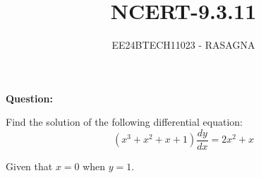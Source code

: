 \documentclass[journal]{IEEEtran}
\begin{document}

\vspace{3cm}

\title{NCERT-9.3.11}
\author{EE24BTECH11023 - RASAGNA}

{\let\newpage\relax\maketitle}

\renewcommand{\thefigure}{\theenumi}
\renewcommand{\thetable}{\theenumi}
\setlength{\intextsep}{10pt} %


\renewcommand{\thetable}{\theenumi}
\textbf{Question:}

Find the solution of the following differential equation:
$$
(x^3 + x^2 + x + 1) \frac{dy}{dx} = 2x^2 + x
$$
\begin{center}
    Given that $x = 0$ when $y = 1$.
\end{center}
\end{document}
